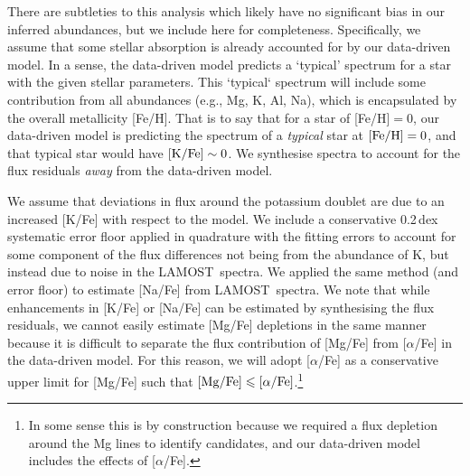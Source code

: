 \documentclass[a4paper,fleqn,usenatbib]{mnras}
\newcommand{\todo}[1]{\textcolor{red}{#1}}
\newcommand{\project}[1]{#1}
\newcommand{\lamost}{\project{LAMOST}}
\begin{document}
There are subtleties to this analysis which likely have no significant bias in our inferred abundances, but we include here for completeness. Specifically, we assume that some stellar absorption is already accounted for by our data-driven model. In a sense, the data-driven model predicts a `typical' spectrum for a star with the given stellar parameters. This `typical` spectrum will include some contribution from all abundances (e.g., Mg, K, Al, Na), which is encapsulated by the overall metallicity [Fe/H]. That is to say that for a star of [Fe/H]$ = 0$, our data-driven model is predicting the spectrum of a \emph{typical} star at $[{\rm Fe/H}] = 0$, and that typical star would have $[{\rm K/Fe}] \sim 0$. We synthesise spectra to account for the flux residuals \emph{away} from the data-driven model. 



We assume that deviations in flux around the potassium doublet are due to an increased [K/Fe] with respect to the model. We include a conservative 0.2\,dex systematic error floor applied in quadrature with the fitting errors to account for some component of the flux differences not being from the abundance of K, but instead due to noise in the \lamost\ spectra. We applied the same method (and error floor) to estimate [Na/Fe] from \lamost\ spectra. We note that while enhancements in [K/Fe] or [Na/Fe] can be estimated by synthesising the flux residuals, we cannot easily estimate [Mg/Fe] depletions in the same manner because it is difficult to separate the flux contribution of [Mg/Fe] from [$\alpha$/Fe] in the data-driven model. For this reason, we will adopt [$\alpha$/Fe] as a conservative upper limit for [Mg/Fe] such that $[{\rm Mg}/{\rm Fe}] \leq [\alpha/{\rm Fe}]$.\footnote{In some sense this is by construction because we required a flux depletion around the Mg lines to identify candidates, and our data-driven model includes the effects of [$\alpha$/Fe].}

\end{document}
